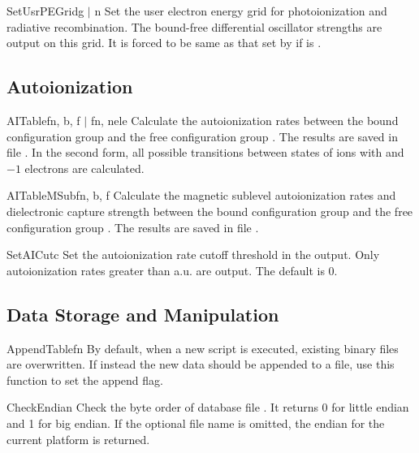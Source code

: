 \begin{fundesc}{SetUsrPEGrid}{g $\mid$ n}
Set the user electron energy grid for photoionization and radiative
recombination. The bound-free differential oscillator strengths are output on
this grid. It is forced to be same as that set by  if
 is .
\end{fundesc}


\subsection{Autoionization}

\begin{fundesc}{AITable}{fn, b, f $\mid$ fn, nele}
Calculate the autoionization rates between the bound configuration group 
and the free configuration group . The results are saved in file
. In the second form, all possible transitions between states of
ions with  and $-1$ electrons are calculated.
\end{fundesc}

\begin{fundesc}{AITableMSub}{fn, b, f}
Calculate the magnetic sublevel autoionization rates and dielectronic capture
strength between the bound configuration group  and the free
configuration group . The results are saved in file .
\end{fundesc}

\begin{fundesc}{SetAICut}{c}
Set the autoionization rate cutoff threshold in the output. Only
autoionization rates greater than  a.u. are output. The default is 0.
\end{fundesc}


\subsection{Data Storage and Manipulation}

\begin{fundesc}{AppendTable}{fn}
By default, when a new script is executed, existing binary files are
overwritten. If instead the new data should be appended to a file, use
this function to set the append flag.
\end{fundesc}

\begin{fundesc}{CheckEndian}{}
Check the byte order of database file . It returns 0 for little endian
and 1 for big endian. If the optional file name  is omitted, the
endian for the current platform is returned.
\end{fundesc}

